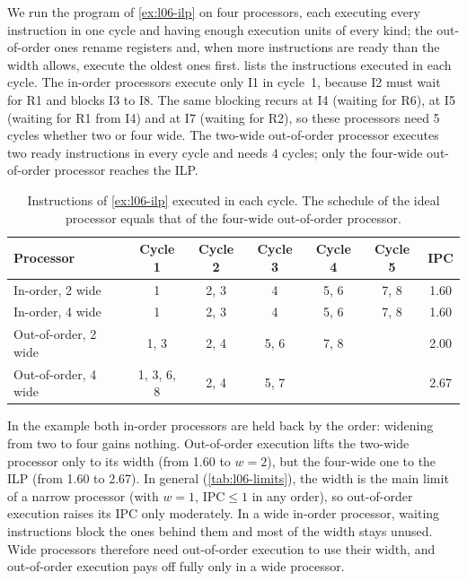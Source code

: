 \documentclass[../main.tex]{subfiles}
\begin{document}
\begin{example}
  \label{ex:l06-ipc}
  We run the program of \cref{ex:l06-ilp} on four processors, each
  executing every instruction in one cycle and having enough execution units
  of every kind; the out-of-order ones rename
  registers and, when more instructions are ready than the width allows,
  execute the oldest ones first.   lists the instructions
  executed in each cycle.  The in-order processors execute only I1 in
  cycle~1, because I2 must wait for R1 and blocks I3 to I8.  The same
  blocking recurs at I4 (waiting for R6), at I5 (waiting for R1 from I4) and
  at I7 (waiting for R2), so these processors need 5 cycles whether two or
  four wide.  The two-wide out-of-order processor executes two
  ready instructions in every cycle and needs 4 cycles; only the four-wide
  out-of-order processor reaches the ILP.
\end{example}

\begin{table}[htbp]
  \centering\small
  \caption{Instructions of \cref{ex:l06-ilp} executed in each cycle.  The
    schedule of the ideal processor equals that of the four-wide
    out-of-order processor.}
  \label{tab:l06-ipc}
  \begin{tabular}{@{}lcccccc@{}}
    \toprule
    Processor & Cycle 1 & Cycle 2 & Cycle 3 & Cycle 4 & Cycle 5 & IPC \\
    \midrule
    In-order, 2 wide     & 1          & 2, 3 & 4    & 5, 6 & 7, 8 & 1.60 \\
    In-order, 4 wide     & 1          & 2, 3 & 4    & 5, 6 & 7, 8 & 1.60 \\
    Out-of-order, 2 wide & 1, 3       & 2, 4 & 5, 6 & 7, 8 &      & 2.00 \\
    Out-of-order, 4 wide & 1, 3, 6, 8 & 2, 4 & 5, 7 &      &      & 2.67 \\
    \bottomrule
  \end{tabular}
\end{table}

In the example both in-order processors are held back by the order:
widening from two to four gains nothing.  Out-of-order execution lifts the
two-wide processor only to its width (from 1.60 to $w = 2$), but the
four-wide one to the ILP (from 1.60 to 2.67).  In general
(\cref{tab:l06-limits}), the width is the main limit of a narrow processor
(with $w = 1$, $\text{IPC} \le 1$ in any order), so out-of-order execution
raises its IPC only moderately.  In a wide in-order processor, waiting instructions
block the ones behind them and most of the width stays unused.  Wide
processors therefore need out-of-order execution to use their width, and
out-of-order execution pays off fully only in a wide processor.
\end{document}

